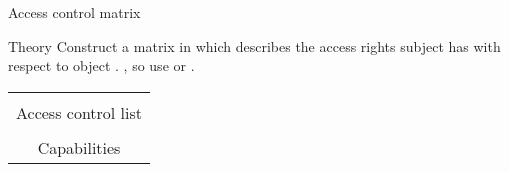\begin{slide}{Access control matrix}
  \begin{block}{Theory}
    Construct a matrix in which  describes the access rights subject  has with respect to
    object . , so use  or .
  \end{block}
  \vspace*{-6pt}
  \begin{centerfig}
    \begin{tabular}{c}
      [0.83]{09-23a} \\
      {\small Access control list} \\ 
      [0.83]{09-23b} \\
      {\small Capabilities}
    \end{tabular}
  \end{centerfig}
  
\end{slide}
